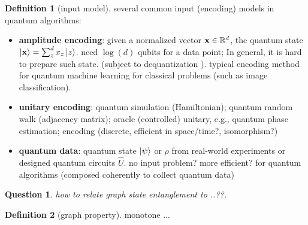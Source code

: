 \documentclass[
10pt,
aps,
pra,
linenumbers,
floatfix,
]{revtex4-2}
\theoremstyle{plain}
\newtheorem{question}{Question}
\theoremstyle{definition}
\newtheorem{definition}{Definition}
\newcommand{\U}{\hat{U}}
\newcommand{\dm}{\rho}
\newcommand{\oracle}{\hat{O}}
\begin{document}
\begin{definition}[input model]\label{def:input_model}
	several common input (encoding) models in quantum algorithms: 
	\begin{itemize}


		\item \textbf{amplitude encoding}: given a normalized vector $\vb{x}\in\mathbb{R}^d$, the quantum state $\ket{\vb{x}}=\sum_z^d x_z\ket{z}$. 
		need $\log(d) $ qubits for a data point; 
		In general, it is hard to prepare such state. (subject to dequantization \cite{tangQuantumPrincipalComponent2021}). 
		typical encoding method for quantum machine learning for classical problems (such as image classification).

		\item \textbf{unitary encoding}: quantum simulation (Hamiltonian); quantum random walk (adjacency matrix); oracle (controlled) unitary, e.g., quantum phase estimation;
		 encoding (discrete, efficient in space/time?, isomorphism?)

		\item \textbf{quantum data}: quantum state $\ket{\psi}$ or $\dm$ from real-world experiments or designed quantum circuits $\U$.
		no input problem? more efficient? for quantum algorithms
		(composed coherently to collect quantum data)


	\end{itemize}
\end{definition}
\begin{question}
	how to relate graph state entanglement to 
	..??.
\end{question} 
\begin{definition}[graph property]\label{def:graph_property}
	monotone ...
\end{definition}
\end{document}
